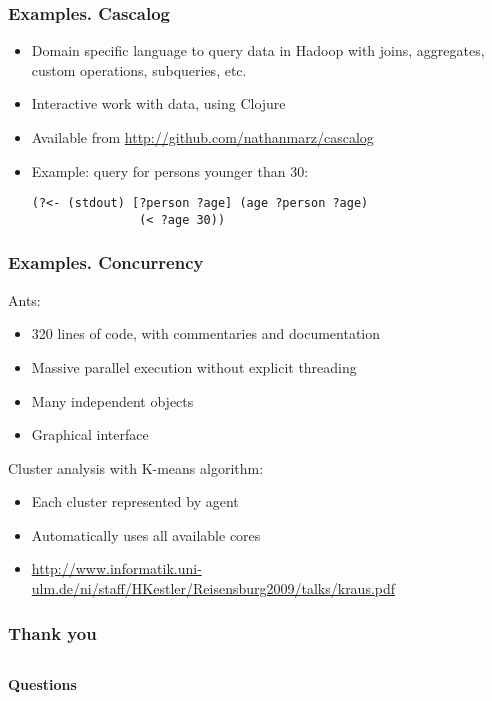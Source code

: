 \begin{frame}[t,fragile]
  \frametitle{Examples. Cascalog}
  \begin{itemize}
  \item Domain specific language to query data in Hadoop with joins, aggregates, custom
    operations, subqueries, etc.
  \item Interactive work with data, using Clojure
  \item Available from \url{http://github.com/nathanmarz/cascalog}
  \item Example: query for persons younger than 30:
\begin{lstlisting}
(?<- (stdout) [?person ?age] (age ?person ?age)
               (< ?age 30))
\end{lstlisting}
  \end{itemize}
\end{frame}

\begin{frame}[t,fragile]
  \frametitle{Examples. Concurrency}
Ants:
  \begin{itemize}
  \item 320 lines of code, with commentaries and documentation
  \item Massive parallel execution without explicit threading
  \item Many independent objects
  \item Graphical interface
  \end{itemize}

Cluster analysis with K-means algorithm:
\begin{itemize}
\item Each cluster represented by agent
\item Automatically uses all available cores
\item \url{http://www.informatik.uni-ulm.de/ni/staff/HKestler/Reisensburg2009/talks/kraus.pdf}
\end{itemize}

\end{frame}

\begin{frame}
  \frametitle{Thank you}
  \begin{columns}
    \begin{column}{0.65\textwidth}
\raggedleft       \Huge{\textbf{Questions}} 
    \end{column}
    \begin{column}{0.35\textwidth}
    \end{column}
  \end{columns}
\end{frame}



